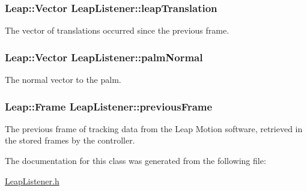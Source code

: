 \subsubsection[{\texorpdfstring{leap\+Translation}{leapTranslation}}]{\setlength{\rightskip}{0pt plus 5cm}Leap\+::\+Vector Leap\+Listener\+::leap\+Translation\hspace{0.3cm}{\ttfamily [private]}}\hypertarget{classLeapListener_a31f0ee8db7d3954d0b2a7cc7c6cd5670}{}\label{classLeapListener_a31f0ee8db7d3954d0b2a7cc7c6cd5670}
The vector of translations occurred since the previous frame. 
\subsubsection[{\texorpdfstring{palm\+Normal}{palmNormal}}]{\setlength{\rightskip}{0pt plus 5cm}Leap\+::\+Vector Leap\+Listener\+::palm\+Normal\hspace{0.3cm}{\ttfamily [private]}}\hypertarget{classLeapListener_ae084bdb6078ae06576cc4b6e678ed094}{}\label{classLeapListener_ae084bdb6078ae06576cc4b6e678ed094}
The normal vector to the palm. 
\subsubsection[{\texorpdfstring{previous\+Frame}{previousFrame}}]{\setlength{\rightskip}{0pt plus 5cm}Leap\+::\+Frame Leap\+Listener\+::previous\+Frame\hspace{0.3cm}{\ttfamily [private]}}\hypertarget{classLeapListener_a9182964b8502db776d1125fbb843a2a8}{}\label{classLeapListener_a9182964b8502db776d1125fbb843a2a8}
The previous frame of tracking data from the Leap Motion software, retrieved in the stored frames by the controller. 

The documentation for this class was generated from the following file\+:\begin{DoxyCompactItemize}
\item 
\hyperlink{LeapListener_8h}{Leap\+Listener.\+h}\end{DoxyCompactItemize}
